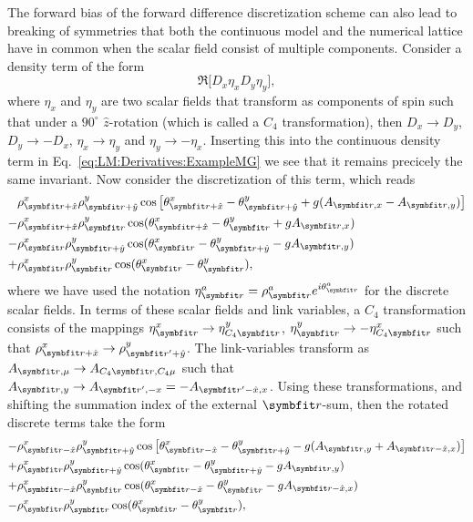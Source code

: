 The forward bias of the forward difference discretization scheme can also lead to breaking of symmetries that both the continuous model and the
numerical lattice have in common when the scalar field consist of multiple components. Consider a density term of the form
\begin{equation}
    \label{eq:LM:Derivatives:ExampleMG}
    \Re\Big[D_x\eta_xD_y\eta_y\Big],
\end{equation}
where $\eta_x$ and $\eta_y$ are two scalar fields that transform as components of spin such that under a $90^\circ$ $\hat{z}$-rotation
(which is called a $C_4$ transformation), then
$D_x\to D_y$, $D_y\to -D_x$, $\eta_x\to \eta_y$ and $\eta_y\to -\eta_x$. Inserting this into the continuous density term in 
Eq.~\eqref{eq:LM:Derivatives:ExampleMG} we see that it remains precicely the same \ie invariant. Now consider the discretization of this term,
which reads
\begin{equation}
    \label{eq:LM:Derivatives:ExampleMG:Discrete}
    \begin{split}
        &\rho^x_{\v{r}+\hat{x}}\rho^y_{\v{r}+\hat{y}}\cos\big[\theta^x_{\v{r}+\hat{x}}-\theta^y_{\v{r}+\hat{y}}+g(A_{\v{r},x}-A_{\v{r},y})\big]\\
        - &\rho^x_{\v{r}+\hat{x}}\rho^y_\v{r}\cos(\theta^x_{\v{r}+\hat{x}} - \theta^y_\v{r} + gA_{\v{r},x})\\
        - &\rho^x_\v{r}\rho^y_{\v{r}+\hat{y}}\cos(\theta^x_\v{r}-\theta^y_{\v{r}+\hat{y}}-gA_{\v{r},y})\\
        + &\rho^x_\v{r}\rho^y_\v{r}\cos(\theta^x_\v{r}-\theta^y_\v{r}),
    \end{split}
\end{equation}
where we have used the notation $\eta^a_\v{r} = \rho^a_\v{r}e^{i\theta^a_\v{r}}$ for the discrete scalar fields. In terms of these scalar fields
and link variables, a $C_4$ transformation consists of the mappings $\eta^x_\v{r}\to\eta^y_{C_4\v{r}}$, $\eta^y_\v{r}\to-\eta^x_{C_4\v{r}}$
such that \eg $\rho^x_{\v{r}+\hat{x}} \to \rho^y_{\v{r}'+\hat{y}}$. The link-variables transform as $A_{\v{r},\mu}\to A_{C_4\v{r},C_4\mu}$ such
that \eg $A_{\v{r},y}\to A_{\v{r}',-x}=-A_{\v{r}'-\hat{x},x}$. Using these transformations, and shifting the summation index of the 
external $\v{r}$-sum, then the rotated discrete terms take the form
\begin{equation}
    \label{eq:LM:Derivatives:ExampleMG:Discrete:Rotated}
    \begin{split}
        -&\rho^x_{\v{r}-\hat{x}}\rho^y_{\v{r}+\hat{y}}\cos\big[\theta^x_{\v{r}-\hat{x}}-\theta^y_{\v{r}+\hat{y}}-g(A_{\v{r},y}+A_{\v{r}-\hat{x},x})\big]\\
        +&\rho^x_\v{r}\rho^y_{\v{r}+\hat{y}}\cos(\theta^x_\v{r} - \theta^y_{\v{r}+\hat{y}}-gA_{\v{r},y})\\
        +&\rho^x_{\v{r}-\hat{x}}\rho^y_\v{r}\cos(\theta^x_{\v{r}-\hat{x}}-\theta^y_\v{r}-gA_{\v{r}-\hat{x},x})\\
        -&\rho^x_\v{r}\rho^y_\v{r}\cos(\theta^x_\v{r}-\theta^y_\v{r}),
    \end{split}
\end{equation}
